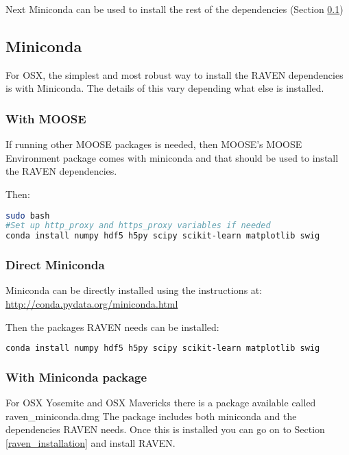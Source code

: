 Next Miniconda can be used to install the rest of the dependencies
(Section \ref{miniconda})


\subsection{Miniconda}
\label{miniconda}

For OSX, the simplest and most robust way to install the RAVEN dependencies
is with Miniconda.  The details of this vary depending what else is
installed.

\subsubsection{With MOOSE}
\label{miniconda_moose}

If running other MOOSE packages is needed, then MOOSE's MOOSE
Environment package comes with miniconda and that should be used to
install the RAVEN dependencies.

Then:
\begin{lstlisting}[language=bash]
sudo bash
#Set up http_proxy and https_proxy variables if needed
conda install numpy hdf5 h5py scipy scikit-learn matplotlib swig
\end{lstlisting}

\goToRavenInstallation

\subsubsection{Direct Miniconda}

Miniconda can be directly installed using the instructions at: \url{http://conda.pydata.org/miniconda.html}

Then the packages RAVEN needs can be installed:
\begin{lstlisting}[language=bash]
conda install numpy hdf5 h5py scipy scikit-learn matplotlib swig
\end{lstlisting}

\goToRavenInstallation

\subsubsection{With Miniconda package}

For OSX Yosemite and OSX Mavericks there is a package available called
raven\_miniconda.dmg The package includes both miniconda and the
dependencies RAVEN needs.  Once this is installed you can go on to Section \ref{raven_installation} and install RAVEN.

